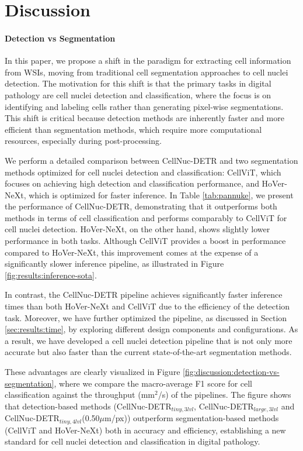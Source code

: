 \section{Discussion}
\label{sec:discussion}

\paragraph{Detection vs Segmentation} In this paper, we propose a shift in the paradigm for extracting cell information from WSIs, moving from traditional cell segmentation approaches to cell nuclei detection. The motivation for this shift is that the primary tasks in digital pathology are cell nuclei detection and classification, where the focus is on identifying and labeling cells rather than generating pixel-wise segmentations. This shift is critical because detection methods are inherently faster and more efficient than segmentation methods, which require more computational resources, especially during post-processing.

We perform a detailed comparison between CellNuc-DETR and two segmentation methods optimized for cell nuclei detection and classification: CellViT, which focuses on achieving high detection and classification performance, and HoVer-NeXt, which is optimized for faster inference. In Table \ref{tab:pannuke}, we present the performance of CellNuc-DETR, demonstrating that it outperforms both methods in terms of cell classification and performs comparably to CellViT for cell nuclei detection. HoVer-NeXt, on the other hand, shows slightly lower performance in both tasks. Although CellViT provides a boost in performance compared to HoVer-NeXt, this improvement comes at the expense of a significantly slower inference pipeline, as illustrated in Figure \ref{fig:results:inference-sota}.

In contrast, the CellNuc-DETR pipeline achieves significantly faster inference times than both HoVer-NeXt and CellViT due to the efficiency of the detection task. Moreover, we have further optimized the pipeline, as discussed in Section \ref{sec:results:time}, by exploring different design components and configurations. As a result, we have developed a cell nuclei detection pipeline that is not only more accurate but also faster than the current state-of-the-art segmentation methods.

These advantages are clearly visualized in Figure \ref{fig:discussion:detection-vs-segmentation}, where we compare the macro-average F1 score for cell classification against the throughput (mm$^2$/s) of the pipelines. The figure shows that detection-based methods (CellNuc-DETR$_{tiny,3lvl}$, CellNuc-DETR$_{large,3lvl}$ and CellNuc-DETR$_{tiny,4lvl}$(0.50$\mu$m/px)) outperform segmentation-based methods (CellViT and HoVer-NeXt) both in accuracy and efficiency, establishing a new standard for cell nuclei detection and classification in digital pathology.

